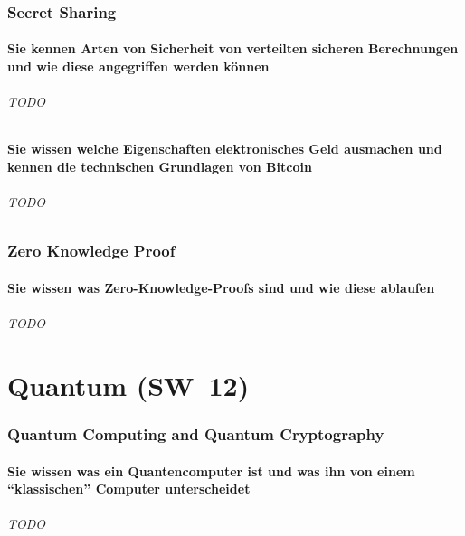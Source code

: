 \documentclass[10pt,a4paper]{article}
\begin{document}
\section{Secret Sharing}
\subsection*{Sie kennen Arten von Sicherheit von verteilten sicheren Berechnungen und wie diese angegriffen werden können}
\paragraph*{TODO}
\subsection*{Sie wissen welche Eigenschaften elektronisches Geld ausmachen und kennen die technischen Grundlagen von Bitcoin}
\paragraph*{TODO}
\section{Zero Knowledge Proof}
\subsection*{Sie wissen was Zero-Knowledge-Proofs sind und wie diese ablaufen}
\paragraph*{TODO}



\part{Quantum (SW~12)}
\section{Quantum Computing and Quantum Cryptography}
\subsection*{Sie wissen was ein Quantencomputer ist und was ihn von einem "`klassischen"' Computer unterscheidet}
\paragraph*{TODO}
\end{document}
